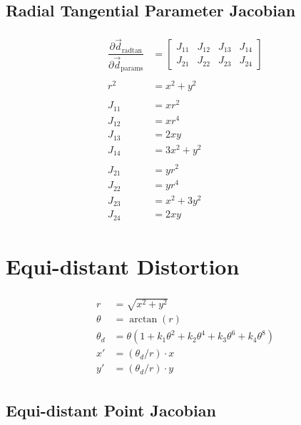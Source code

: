 \subsection{Radial Tangential Parameter Jacobian}

\begin{align}
  \begin{split}
    \dfrac{\partial{\Vec{d}_{\text{radtan}}}}{\partial{\Vec{d}_{\text{params}}}} &=
      \begin{bmatrix}
        J_{11} & J_{12} & J_{13} & J_{14} \\
        J_{21} & J_{22} & J_{23} & J_{24}
      \end{bmatrix} \\ \\
      r^2 &= x^2 + y^2 \\ \\
      J_{11} &= x r^2 \\
      J_{12} &= x r^4 \\
      J_{13} &= 2 x y \\
      J_{14} &= 3 x^2 + y^2 \\ \\
      J_{21} &= y r^2 \\
      J_{22} &= y r^4 \\
      J_{23} &= x^2 + 3 y^2 \\
      J_{24} &= 2 x y
    \end{split}
\end{align}



\section{Equi-distant Distortion}

\begin{align}
\begin{split}
  r &= \sqrt{x^{2} + y^{2}} \\
  \theta &= \arctan{(r)} \\
  \theta_d &= \theta (1 + k_1 \theta^2 + k_2 \theta^4 + k_3 \theta^6 + k_4 \theta^8) \\
  x' &= (\theta_d / r) \cdot x \\
  y' &= (\theta_d / r) \cdot y
\end{split}
\end{align}


\subsection{Equi-distant Point Jacobian}

